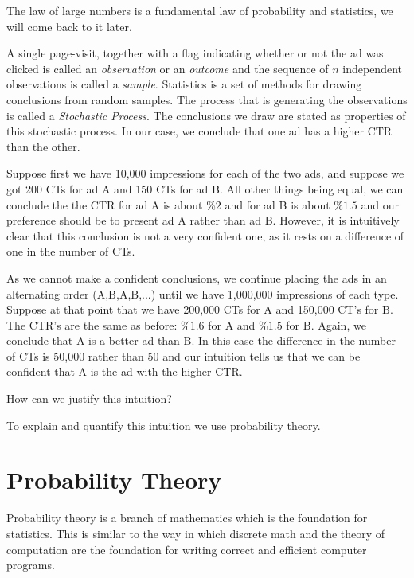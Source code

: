 The law of large numbers is a fundamental law of probability and
statistics, we will come back to it later.

A single page-visit, together with a flag indicating whether or not
the ad was clicked is called an {\em observation} or an {\em outcome}
and the sequence of $n$ independent observations is called a {\em
  sample}. Statistics is a set of methods for drawing conclusions from
random samples. The process that is generating the observations is
called a {\em Stochastic Process}. The conclusions we draw are stated
as properties of this stochastic process. In our case, we conclude
that one ad has a higher CTR than the other.

Suppose first we have 10,000 impressions for each of the two ads, and
suppose we got 200 CTs for ad A and 150 CTs for ad B. All other things
being equal, we can conclude the the CTR for ad A is about \%$2$ and for
ad B is about \%$1.5$ and our preference should be to present
ad A rather than ad B. However, it is intuitively clear that this
conclusion is not a very confident one, as it rests on a difference of
one in the number of CTs.

As we cannot make a confident conclusions, we continue placing the ads
in an alternating order (A,B,A,B,...) until we have 1,000,000
impressions of each type. Suppose at that point that we have 200,000
CTs for A and 150,000 CT's for B. The CTR's are the same as before:
\%$1.6$ for A and  \%$1.5$  for B. Again, we conclude that A is a
better ad than B. In this case the difference in
the number of CTs is 50,000 rather than 50 and our intuition tells us
that we can be confident that A is the ad with the higher CTR.

How can we justify this intuition?

To explain and quantify this intuition we use probability theory.

\section{Probability Theory}

Probability theory is a branch of mathematics which is the foundation
for statistics. This is similar to the way in which discrete math and
the theory of computation are the foundation for writing correct and
efficient computer programs.


